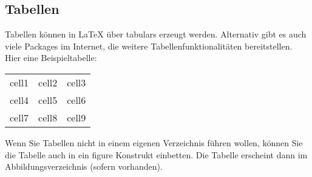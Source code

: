 \subsection{Tabellen}
Tabellen können in \LaTeX{} über tabulars erzeugt werden. Alternativ gibt es auch viele Packages im Internet, die weitere
Tabellenfunktionalitäten bereitstellen.\\
Hier eine Beispieltabelle:\\
\begin{center}
    \begin{tabular}{ |c|c|c| } 
        \hline
        cell1 & cell2 & cell3 \\ 
        cell4 & cell5 & cell6 \\ 
        cell7 & cell8 & cell9 \\ 
        \hline
    \end{tabular}
    \label{tbl:nicetable}
\end{center}
Wenn Sie Tabellen nicht in einem eigenen Verzeichnis führen wollen, können Sie die Tabelle auch in ein figure Konstrukt einbetten.
Die Tabelle erscheint dann im Abbildungsverzeichnis (sofern vorhanden).